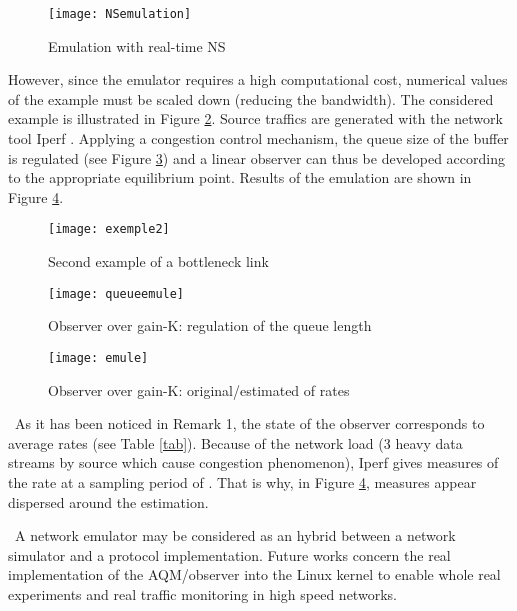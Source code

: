 \documentclass[a4paper, 10pt, onecolumn]{article}
\begin{document}
\begin{figure}
\vspace*{-1cm}
       \centerline{\texttt{[image: NSemulation]}}
       \caption{Emulation with real-time NS}
       \label{NSemulation}
\end{figure}

However, since the emulator requires a high computational cost, numerical values of the example must be scaled down (reducing the bandwidth). The considered example is illustrated in Figure \ref{exemple2}. Source traffics are generated with the network tool Iperf \cite{iperf}. Applying a congestion control mechanism, the queue size of the buffer is regulated (see Figure \ref{queueemule}) and a linear observer can thus be developed according to the appropriate equilibrium point. Results of the emulation are shown in Figure \ref{emule}.
\begin{figure}
       \centerline{\texttt{[image: exemple2]}}
\vspace*{-1.5cm}
       \caption{Second example of a bottleneck link}
       \label{exemple2}
\end{figure}

\begin{figure}
       \centerline{\texttt{[image: queueemule]}}
       \caption{Observer over gain-K: regulation of the queue length}
       \label{queueemule}
\end{figure}

\begin{figure}
       \centerline{\texttt{[image: emule]}}
\vspace*{-2cm}
       \caption{Observer over gain-K: original/estimated of rates}
       \label{emule}
\end{figure}

~\indent As it has been noticed in Remark 1, the state of the observer corresponds to average rates (see Table \ref{tab}). Because of the network load (3 heavy data streams by source which cause congestion phenomenon), Iperf gives measures of the rate at a sampling period of . That is why, in Figure \ref{emule}, measures appear dispersed around the estimation.

~\indent A network emulator may be considered as an hybrid between a network simulator and a protocol implementation. Future works concern the real implementation of the AQM/observer into the Linux kernel to enable whole real experiments and real traffic monitoring in high speed networks.\\
\end{document}
